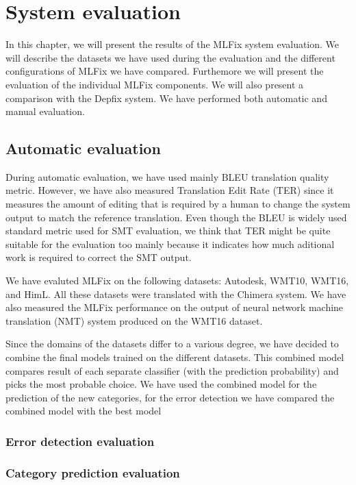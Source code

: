 \chapter{System evaluation}
\label{chap:eval}

In this chapter, we will present the results of the MLFix system evaluation.
We will describe the datasets we have used during the evaluation and the different
configurations of MLFix we have compared. Furthemore we will present the evaluation
of the individual MLFix components.
We will also present a comparison with the Depfix
system. We have performed both automatic and manual evaluation.

\section{Automatic evaluation}

During automatic evaluation, we have used mainly BLEU\cite{papineni:2002} translation quality metric. However, we have also
measured Translation Edit Rate\cite{Snover06astudy} (TER) since it measures the amount of editing that is required by a human
to change the system output to match the reference translation. Even though the BLEU is widely used standard metric
used for SMT evaluation, we think that TER might be quite suitable for the evaluation too mainly because it indicates
how much aditional work is required to correct the SMT output.

We have evaluted MLFix on the following datasets: Autodesk, WMT10, WMT16, and HimL. All these datasets
were translated with the Chimera system. We have also measured the MLFix performance on the output of neural network
machine translation (NMT) system produced on the WMT16 dataset.

Since the domains of the datasets differ to a various degree, we have decided to combine the final models trained
on the different datasets. This combined model
compares result of each separate classifier (with the prediction probability) and picks the most probable choice.
We have used the combined model for the prediction of the new categories, for the error detection we have compared
the combined model with the best model


\subsection{Error detection evaluation}

\subsection{Category prediction evaluation}

